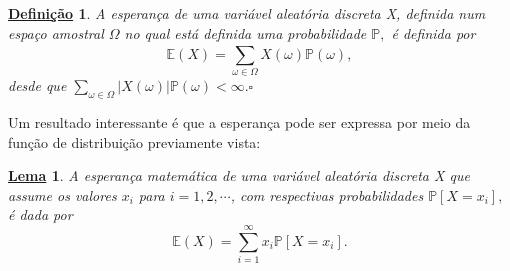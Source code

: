 \documentclass{article}
\newtheorem*{def*}{\underline{Defini\c c\~ao}}
\newtheorem*{lemma*}{\underline{Lema}}
\begin{document}
\begin{def*}
  A esperança de uma variável aleatória discreta X, definida num espaço amostral \(\Omega \) no qual está definida uma
probabilidade \(\mathbb{P},\) é definida por 
  \[
    \mathbb{E}(X) = \sum\limits_{\omega \in \Omega }^{}X(\omega )\mathbb{P}(\omega ),
  \]
desde que \(\sum\limits_{\omega \in \Omega }^{}|X(\omega )|\mathbb{P}(\omega ) < \infty. \square\)
\end{def*}
  Um resultado interessante é que a esperança pode ser expressa por meio da função de distribuição previamente vista:
\begin{lemma*}
  A esperança matemática de uma variável aleatória discreta X que assume os valores \(x_{i}\) para \(i = 1, 2, \cdots\), com
respectivas probabilidades \(\mathbb{P}[X=x_{i}],\) é dada por 
  \[
    \mathbb{E}(X) = \sum\limits_{i=1}^{\infty}x_{i}\mathbb{P}[X=x_{i}].
  \]
\end{lemma*}
\end{document}

